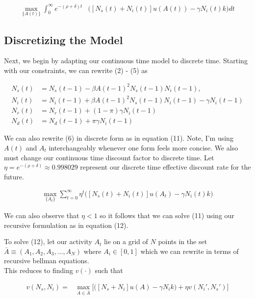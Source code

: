 \documentclass[12pt]{article}
\begin{document}
\begin{align}
	\max_{\{A(t) \}} \int_0^\infty 
	e^{-(\rho + \delta)t}
	&\bigg(
		[N_s(t) + N_i(t)] u(A(t)) - \gamma N_i(t) k
	\bigg)
	dt
\end{align} 

\subsection{Discretizing the Model}

Next, we begin by adapting our continuous time model to discrete time. Starting with our constraints, we can rewrite (2) - (5) as

\begin{align}
	N_s (t) &= N_s (t-1) -\beta A(t-1)^2 N_s(t-1) N_i(t-1), \\
	N_i (t) &= N_i (t-1)  + \beta A(t-1)^2 N_s(t-1) N_i(t-1) - \gamma N_i(t-1) \\
	N_r (t) &= N_r(t-1) + (1 - \pi) \gamma N_i(t -1) \\
	N_d(t) &= N_d(t-1) + \pi \gamma N_i(t-1)
\end{align} 

We can also rewrite (6) in discrete form as in equation (11). Note, I'm using $A(t)$ and $A_t$ interchangeably whenever one form feels more concise.
We also must change our continuous time discount factor to discrete time.
Let $\eta =  e^{-(\rho + \delta)} \approx 0.998029 $ represent our discrete time effective discount rate for the future. 


\begin{align}
	\max_{\{A_t\}} \sum_{t=0}^{\infty} \eta^t 
	\bigg( 
		[N_s(t) + N_i(t)] u(A_t) - \gamma N_i(t) k
	\bigg)
\end{align} 


We can also observe that $\eta < 1$ so it follows that we can solve (11) using our recursive formulation as in equation (12).

To solve (12), let our activity $A_t$ lie on a grid of $N$ points in the set $\bar{A} \equiv (A_1, A_2, A_3, \ldots, A_N)$ where $A_i \in [0,1]$
which we can rewrite in terms of recursive bellman equations.
\\
This reduces to finding $v(\cdot)$ such that

\begin{align}
	v(N_s, N_i) = &\max_{A \in \bar{A}} \bigg[ \big( [N_s + N_i] u(A) - \gamma N_i k \big) + \eta v(N_i', N_s') 
	\bigg]
\end{align}                         
\end{document}
